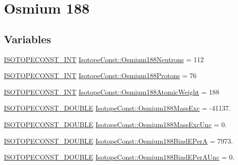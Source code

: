 \hypertarget{group___isotope_const-_osmium-_os188}{}\section{Osmium 188}
\label{group___isotope_const-_osmium-_os188}
\subsection*{Variables}
\begin{DoxyCompactItemize}
\item 
\mbox{\hyperlink{group___isotope_const-_macros_ga5f18360b3e99483a35c32d789e62621c}{I\+S\+O\+T\+O\+P\+E\+C\+O\+N\+S\+T\+\_\+\+I\+NT}} \mbox{\hyperlink{group___isotope_const-_osmium-_os188_gae97f1a5747905afd77985272f77cf2b5}{Isotope\+Const\+::\+Osmium188\+Neutrons}} = 112
\item 
\mbox{\hyperlink{group___isotope_const-_macros_ga5f18360b3e99483a35c32d789e62621c}{I\+S\+O\+T\+O\+P\+E\+C\+O\+N\+S\+T\+\_\+\+I\+NT}} \mbox{\hyperlink{group___isotope_const-_osmium-_os188_gaa9364d56a5377ef4c4057d6fd68436e2}{Isotope\+Const\+::\+Osmium188\+Protons}} = 76
\item 
\mbox{\hyperlink{group___isotope_const-_macros_ga5f18360b3e99483a35c32d789e62621c}{I\+S\+O\+T\+O\+P\+E\+C\+O\+N\+S\+T\+\_\+\+I\+NT}} \mbox{\hyperlink{group___isotope_const-_osmium-_os188_ga1305c00746875a5abf547fd299491a71}{Isotope\+Const\+::\+Osmium188\+Atomic\+Weight}} = 188
\item 
\mbox{\hyperlink{group___isotope_const-_macros_ga8f45a7272ce02c0b4c65c44636ed719a}{I\+S\+O\+T\+O\+P\+E\+C\+O\+N\+S\+T\+\_\+\+D\+O\+U\+B\+LE}} \mbox{\hyperlink{group___isotope_const-_osmium-_os188_ga293bd58342cf3fa9e8d7bc40bb35282d}{Isotope\+Const\+::\+Osmium188\+Mass\+Exc}} = -\/41137.
\item 
\mbox{\hyperlink{group___isotope_const-_macros_ga8f45a7272ce02c0b4c65c44636ed719a}{I\+S\+O\+T\+O\+P\+E\+C\+O\+N\+S\+T\+\_\+\+D\+O\+U\+B\+LE}} \mbox{\hyperlink{group___isotope_const-_osmium-_os188_ga984c14ce4736c89cfdd1858388d4ba3d}{Isotope\+Const\+::\+Osmium188\+Mass\+Exc\+Unc}} = 0.
\item 
\mbox{\hyperlink{group___isotope_const-_macros_ga8f45a7272ce02c0b4c65c44636ed719a}{I\+S\+O\+T\+O\+P\+E\+C\+O\+N\+S\+T\+\_\+\+D\+O\+U\+B\+LE}} \mbox{\hyperlink{group___isotope_const-_osmium-_os188_ga16f3aee18895a81267a6cb7e4999c33a}{Isotope\+Const\+::\+Osmium188\+Bind\+E\+PerA}} = 7973.
\item 
\mbox{\hyperlink{group___isotope_const-_macros_ga8f45a7272ce02c0b4c65c44636ed719a}{I\+S\+O\+T\+O\+P\+E\+C\+O\+N\+S\+T\+\_\+\+D\+O\+U\+B\+LE}} \mbox{\hyperlink{group___isotope_const-_osmium-_os188_ga5b5cd6c34bb30ae029cdd231ad1738dc}{Isotope\+Const\+::\+Osmium188\+Bind\+E\+Per\+A\+Unc}} = 0.

\end{DoxyCompactItemize}
